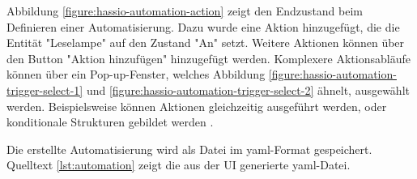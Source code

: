 Abbildung \ref{figure:hassio-automation-action} zeigt den Endzustand beim Definieren einer
Automatisierung. Dazu wurde eine Aktion hinzugefügt, die die Entität "Leselampe" auf den Zustand
"An" setzt. Weitere Aktionen können über den Button "Aktion hinzufügen" hinzugefügt werden.
Komplexere Aktionsabläufe können über ein Pop-up-Fenster, welches Abbildung
\ref{figure:hassio-automation-trigger-select-1} und \ref{figure:hassio-automation-trigger-select-2}
ähnelt, ausgewählt werden. Beispielsweise können Aktionen gleichzeitig ausgeführt werden, oder
konditionale Strukturen gebildet werden \parencite{homeassistantScriptSyntax}.



Die erstellte Automatisierung wird als Datei im \ac{yaml}-Format gespeichert. Quelltext
\ref{lst:automation} zeigt die aus der UI generierte \ac{yaml}-Datei. 
